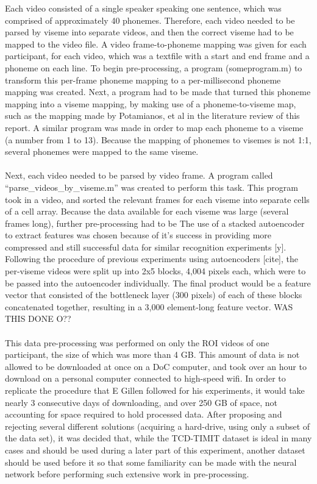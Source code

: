 \documentclass[12pt,twoside]{report}
\begin{document}
Each video consisted of a single speaker speaking one sentence, which was comprised of approximately 40 phonemes. Therefore, each video needed to be parsed by viseme into separate videos, and then the correct viseme had to be mapped to the video file.
A video frame-to-phoneme mapping was given for each participant, for each video, which was a textfile with a start and end frame and a phoneme on each line. To begin pre-processing, a program (someprogram.m) to transform this per-frame phoneme mapping to a per-millisecond phoneme mapping was created. Next, a program had to be made that turned this phoneme mapping into a viseme mapping, by making use of a phoneme-to-viseme map, such as the mapping made by Potamianos, et al in the literature review of this report. A similar program was made in order to map each phoneme to a viseme (a number from 1 to 13). Because the mapping of phonemes to visemes is not 1:1, several phonemes were mapped to the same viseme. 
\\ \\
Next, each video needed to be parsed by video frame. A program called ``parse\_videos\_by\_viseme.m'' was created to perform this task. This program took in a video, and sorted the relevant frames for each viseme into separate cells of a cell array. Because the data available for each viseme was large (several frames long), further pre-processing had to be The use of a stacked autoencoder to extract features was chosen because of it’s success in providing more compressed and still successful data for similar recognition experiments [y].
Following the procedure of previous experiments using autoencoders [cite], the per-viseme videos were split up into 2x5 blocks, 4,004 pixels each, which were to be passed into the autoencoder individually. The final product would be a feature vector that consisted of the bottleneck layer (300 pixels) of each of these blocks concatenated together, resulting in a 3,000 element-long feature vector.  WAS THIS DONE O??
\\ \\
This data pre-processing was performed on only the ROI videos of one participant, the size of which was more than 4 GB. This amount of data is not allowed to be downloaded at once on a DoC computer, and took over an hour to download on a personal computer connected to high-speed wifi. In order to replicate the procedure that E Gillen followed for his experiments, it would take nearly 3 consecutive days of downloading, and over 250 GB of space, not accounting for space required to hold processed data. After proposing and rejecting several different solutions (acquiring a hard-drive, using only a subset of the data set), it was decided that, while the TCD-TIMIT dataset is ideal in many cases and should be used during a later part of this experiment, another dataset should be used before it so that some familiarity can be made with the neural network before performing such extensive work in pre-processing. 
\end{document}
